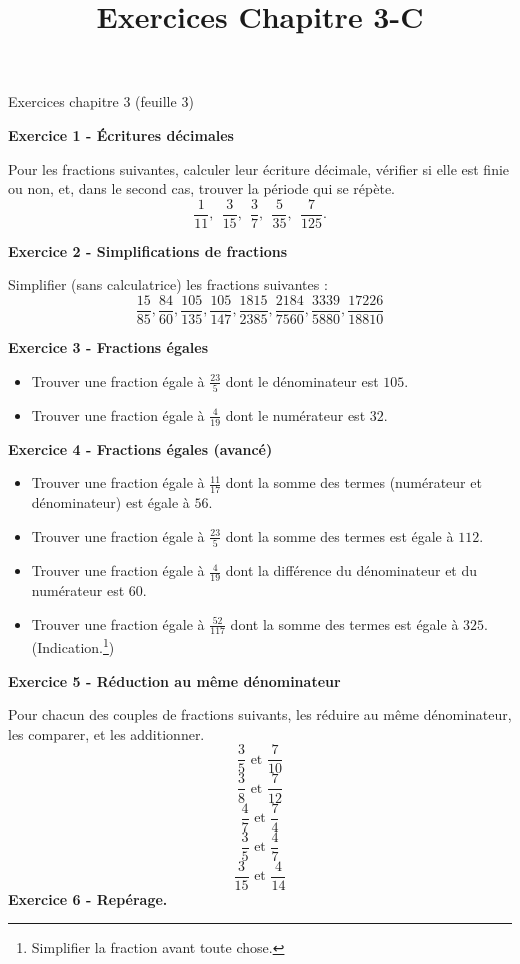 \documentclass[14 pt]{extarticle}
\title{Exercices Chapitre 3-C}
\date{}
\theoremstyle{plain}
\newcounter{n}
\numberwithin{n}{section}
\begin{document}
\begin{center}{\Large  Exercices chapitre 3 (feuille 3)}\\ 
 \end{center}


\textbf{Exercice 1 - Écritures décimales}

Pour les fractions suivantes, calculer leur écriture décimale, vérifier si elle est finie ou non, et, dans le second cas, trouver la période qui se répète. 
\[ \frac{1}{11}, \ \ \frac{3}{15}, \ \ \frac{3}{7}, \ \ \frac{5}{35}, \ \ \frac{7}{125}.\]

\textbf{Exercice 2 - Simplifications de fractions}

Simplifier (sans calculatrice) les fractions suivantes :
 $$\frac{15}{85}, \frac{84}{60},
\frac{105}{135}, \frac{105}{147},
\frac{1 815}{2 385}, \frac{2 184}{7 560}, 
\frac{3 339}{5 880}, \frac{17 226}{18 810}$$

\textbf{Exercice 3 - Fractions égales}
\begin{itemize}
\item Trouver une fraction égale à $\frac{23}{5}$ dont le dénominateur est $105$. 
\item Trouver une fraction égale à $\frac{4}{19}$ dont le numérateur est $32$. 
\end{itemize}


\textbf{Exercice 4 - Fractions égales (avancé)}
\begin{itemize}
\item Trouver une fraction égale à $\frac{11}{17}$ dont la somme des termes (numérateur et dénominateur) est égale à $56$. 
\item Trouver une fraction égale à $\frac{23}{5}$ dont la somme des termes est égale à $112$. 
\item Trouver une fraction égale à $\frac{4}{19}$ dont la différence du dénominateur et du numérateur est $60$. 
\item Trouver une fraction égale à $\frac{52}{117}$ dont la somme des termes est égale à $325$. (Indication.\footnote{Simplifier la fraction avant toute chose.})
\end{itemize}

\textbf{Exercice 5 - Réduction au même dénominateur}

Pour chacun des couples de fractions suivants, les réduire au même dénominateur, les comparer, et les additionner. 
\[ \frac{3}{5}\text{ et } \frac{7}{10}\]
\[ \frac{3}{8}\text{ et } \frac{7}{12}\]
\[ \frac{4}{7}\text{ et } \frac{7}{4}\]
\[ \frac{3}{5}\text{ et } \frac{4}{7}\]
\[ \frac{3}{15}\text{ et } \frac{4}{14}\]
\newpage
\textbf{Exercice 6 - Repérage.}
\end{document}

